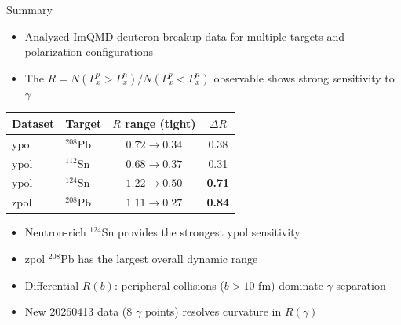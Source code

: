 \documentclass[aspectratio=169,11pt]{beamer}
\begin{document}
\begin{frame}{Summary}
\begin{itemize}
  \item Analyzed ImQMD deuteron breakup data for multiple targets and polarization configurations
  \item The $R = N(P_x^p > P_x^n) / N(P_x^p < P_x^n)$ observable shows strong sensitivity to $\gamma$
\end{itemize}

\vspace{0.3cm}
\begin{table}[h]
\centering
\small
\begin{tabular}{llcc}
\toprule
\textbf{Dataset} & \textbf{Target} & \textbf{$R$ range (tight)} & \textbf{$\Delta R$} \\
\midrule
ypol & $^{208}$Pb  & $0.72 \to 0.34$ & 0.38 \\
ypol & $^{112}$Sn  & $0.68 \to 0.37$ & 0.31 \\
ypol & $^{124}$Sn  & $1.22 \to 0.50$ & \textbf{0.71} \\
zpol & $^{208}$Pb  & $1.11 \to 0.27$ & \textbf{0.84} \\
\bottomrule
\end{tabular}
\end{table}

\begin{itemize}
  \item Neutron-rich $^{124}$Sn provides the strongest ypol sensitivity
  \item zpol $^{208}$Pb has the largest overall dynamic range
  \item Differential $R(b)$: peripheral collisions ($b > 10$ fm) dominate $\gamma$ separation
  \item New 20260413 data (8 $\gamma$ points) resolves curvature in $R(\gamma)$
\end{itemize}
\end{frame}

\end{document}
